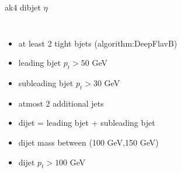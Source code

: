 \documentclass[10pt,xcolor=dvipsnames]{beamer}
\begin{document}
\begin{frame}[fragile]{ak4 dibjet $\eta$ }
\begin{columns}
\begin{itemize}
      \item {at least 2 tight bjets (algorithm:DeepFlavB)}
      \item {leading bjet $p_t > 50 $ GeV}
      \item {subleading bjet $p_t > 30 $ GeV}
      \item {atmost 2 additional jets}
      \item {dijet = leading bjet + subleading bjet}
      \item {dijet mass between (100 GeV,150 GeV)}
      \item {dijet $p_t > 100 $ GeV}
    \end{itemize}
  \end{columns}
\end{frame}

\end{document}
